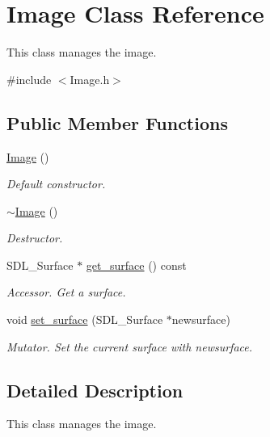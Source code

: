 \hypertarget{classImage}{}\section{Image Class Reference}
\label{classImage}


This class manages the image.  




{\ttfamily \#include $<$Image.\+h$>$}

\subsection*{Public Member Functions}
\begin{DoxyCompactItemize}
\item 
\hyperlink{classImage_a58edd1c45b4faeb5f789b0d036d02313}{Image} ()\hypertarget{classImage_a58edd1c45b4faeb5f789b0d036d02313}{}\label{classImage_a58edd1c45b4faeb5f789b0d036d02313}

\begin{DoxyCompactList}\small\item\em Default constructor. \end{DoxyCompactList}\item 
\hyperlink{classImage_a0294f63700543e11c0f0da85601c7ae5}{$\sim$\+Image} ()\hypertarget{classImage_a0294f63700543e11c0f0da85601c7ae5}{}\label{classImage_a0294f63700543e11c0f0da85601c7ae5}

\begin{DoxyCompactList}\small\item\em Destructor. \end{DoxyCompactList}\item 
S\+D\+L\+\_\+\+Surface $\ast$ \hyperlink{classImage_a963ba7fc811e8520ca6dce52bbdb5725}{get\+\_\+surface} () const 
\begin{DoxyCompactList}\small\item\em Accessor. Get a surface. \end{DoxyCompactList}\item 
void \hyperlink{classImage_ab887e4107f2ea756311e4e9c83d3c695}{set\+\_\+surface} (S\+D\+L\+\_\+\+Surface $\ast$newsurface)
\begin{DoxyCompactList}\small\item\em Mutator. Set the current surface with newsurface. \end{DoxyCompactList}\end{DoxyCompactItemize}


\subsection{Detailed Description}
This class manages the image. 


